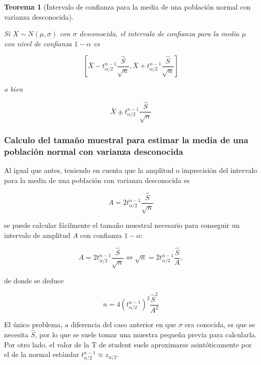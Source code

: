 \documentclass[
  a4paper,
]{scrreport}
\theoremstyle{plain}
\newtheorem{theorem}{Teorema}[chapter]
\theoremstyle{definition}
\theoremstyle{definition}
\theoremstyle{remark}
\begin{document}
\begin{theorem}[Intervalo de confianza para la media de una población
normal con varianza
desconocida]\protect\hypertarget{thm-intervalo-confianza-media-normal-varianza-desconocida}{}\label{thm-intervalo-confianza-media-normal-varianza-desconocida}

Si \(X\sim N(\mu, \sigma)\) con \(\sigma\) desconocida, el
\emph{intervalo de confianza para la media} \(\mu\) con nivel de
confianza \(1-\alpha\) es

\[
\left[\bar{X}-t^{n-1}_{\alpha/2}\frac{\hat{S}}{\sqrt{n}},\bar{X}+t^{n-1}_{\alpha/2}\frac{\hat{S}}{\sqrt{n}}\right]
\]

o bien

\[
\bar{X}\pm t^{n-1}_{\alpha/2}\frac{\hat{S}}{\sqrt{n}}
\]

\end{theorem}

\hypertarget{calculo-del-tamauxf1o-muestral-para-estimar-la-media-de-una-poblaciuxf3n-normal-con-varianza-desconocida}{%
\subsubsection{Calculo del tamaño muestral para estimar la media de una
población normal con varianza
desconocida}\label{calculo-del-tamauxf1o-muestral-para-estimar-la-media-de-una-poblaciuxf3n-normal-con-varianza-desconocida}}

Al igual que antes, teniendo en cuenta que la amplitud o imprecisión del
intervalo para la media de una población con varianza desconocida es

\[
A= 2 t^{n-1}_{\alpha/2}\frac{\hat{S}}{\sqrt{n}}
\]

se puede calcular fácilmente el tamaño muestral necesario para conseguir
un intervalo de amplitud \(A\) con confianza \(1-\alpha\):

\[
A= 2 t^{n-1}_{\alpha/2}\frac{\hat{S}}{\sqrt{n}} \Leftrightarrow \sqrt{n}= 2 t^{n-1}_{\alpha/2}\frac{\hat{S}}{A},
\]

de donde se deduce

\[
{n = 4 (t^{n-1}_{\alpha/2})^2\frac{\hat{S}^2}{A^2}}
\]

El único problema, a diferencia del caso anterior en que \(\sigma\) era
conocida, es que se necesita \(\hat{S}\), por lo que se suele tomar una
muestra pequeña previa para calcularla. Por otro lado, el valor de la T
de student suele aproximarse asintóticamente por el de la normal
estándar \(t^{n-1}_{\alpha/2}\approx z_{\alpha/2}\).
\end{document}
